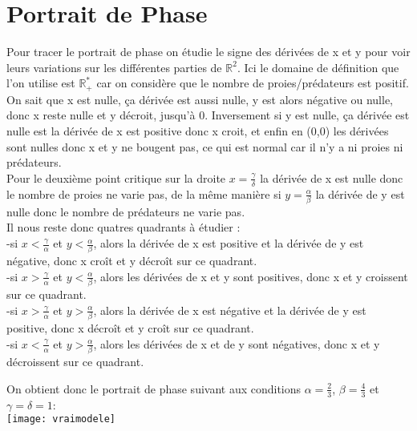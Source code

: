 \documentclass[a4paper,16pt,twoside]{report}
\def \rr {{\mathbb R}} %
\begin{document}
\section{Portrait de Phase}

    Pour tracer le portrait de phase on étudie le signe des dérivées de x et y pour voir leurs variations sur les différentes parties de $\rr^2$. Ici le domaine de définition que l'on utilise est $\rr_+^*$ car on considère que le nombre de proies/prédateurs est positif. On sait que x est nulle, ça dérivée est aussi nulle, y est alors négative ou nulle, donc x reste nulle et y décroit, jusqu'à 0. Inversement si y est nulle, ça dérivée est nulle est la dérivée de x est positive donc x croit, et enfin en (0,0) les dérivées sont nulles donc x et y ne bougent pas, ce qui est normal car il n'y a ni proies ni prédateurs.\\
    
    
    
    
    Pour le deuxième point critique sur la droite $x = \frac{\gamma}{\delta}$ la dérivée de x est nulle donc le nombre de proies ne varie pas, de la même manière si $y = \frac{\alpha}{\beta}$ la dérivée de y est nulle donc le nombre de prédateurs ne varie pas.\\
    
    
    
       Il nous reste donc quatres quadrants à étudier :\\
    -si $x < \frac{\gamma}{\alpha}$ et $y < \frac{\alpha}{\beta}$, alors la dérivée de x est positive et la dérivée de y est négative, donc x croît et y décroît sur ce quadrant.\\
    -si $x > \frac{\gamma}{\alpha}$ et $y < \frac{\alpha}{\beta}$, alors les dérivées de x et y sont positives, donc x et y croissent sur ce quadrant.\\
    -si $x > \frac{\gamma}{\alpha}$ et $y > \frac{\alpha}{\beta}$, alors la dérivée de x est négative et la dérivée de y est positive, donc x décroît et y croît sur ce quadrant.\\
    -si $x < \frac{\gamma}{\alpha}$ et $y > \frac{\alpha}{\beta}$, alors les dérivées de x et de y sont négatives, donc x et y décroissent sur ce quadrant.\\
    \newpage
    
On obtient donc le portrait de phase suivant aux conditions $\alpha = \frac{2}{3}$, $\beta = \frac{4}{3}$ et $\gamma = \delta = 1$:\\
\texttt{[image: vraimodele]}
\end{document}
